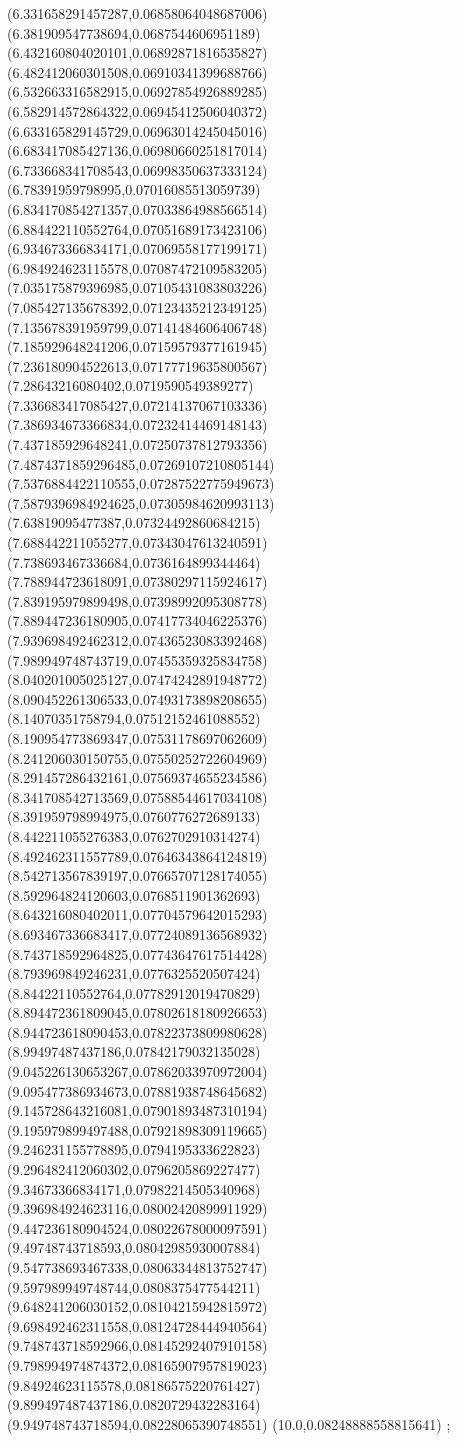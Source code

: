 {(6.331658291457287,0.06858064048687006)
(6.381909547738694,0.0687544606951189)
(6.432160804020101,0.06892871816535827)
(6.482412060301508,0.06910341399688766)
(6.532663316582915,0.06927854926889285)
(6.582914572864322,0.06945412506040372)
(6.633165829145729,0.06963014245045016)
(6.683417085427136,0.06980660251817014)
(6.733668341708543,0.06998350637333124)
(6.78391959798995,0.07016085513059739)
(6.834170854271357,0.07033864988566514)
(6.884422110552764,0.07051689173423106)
(6.934673366834171,0.07069558177199171)
(6.984924623115578,0.07087472109583205)
(7.035175879396985,0.07105431083803226)
(7.085427135678392,0.07123435212349125)
(7.135678391959799,0.07141484606406748)
(7.185929648241206,0.07159579377161945)
(7.236180904522613,0.07177719635800567)
(7.28643216080402,0.0719590549389277)
(7.336683417085427,0.07214137067103336)
(7.386934673366834,0.07232414469148143)
(7.437185929648241,0.07250737812793356)
(7.4874371859296485,0.07269107210805144)
(7.5376884422110555,0.07287522775949673)
(7.5879396984924625,0.07305984620993113)
(7.63819095477387,0.07324492860684215)
(7.688442211055277,0.07343047613240591)
(7.738693467336684,0.0736164899344464)
(7.788944723618091,0.07380297115924617)
(7.839195979899498,0.07398992095308778)
(7.889447236180905,0.07417734046225376)
(7.939698492462312,0.07436523083392468)
(7.989949748743719,0.07455359325834758)
(8.040201005025127,0.07474242891948772)
(8.090452261306533,0.07493173898208655)
(8.14070351758794,0.07512152461088552)
(8.190954773869347,0.07531178697062609)
(8.241206030150755,0.07550252722604969)
(8.291457286432161,0.07569374655234586)
(8.341708542713569,0.07588544617034108)
(8.391959798994975,0.0760776272689133)
(8.442211055276383,0.0762702910314274)
(8.492462311557789,0.07646343864124819)
(8.542713567839197,0.07665707128174055)
(8.592964824120603,0.0768511901362693)
(8.643216080402011,0.07704579642015293)
(8.693467336683417,0.07724089136568932)
(8.743718592964825,0.07743647617514428)
(8.793969849246231,0.0776325520507424)
(8.84422110552764,0.07782912019470829)
(8.894472361809045,0.07802618180926653)
(8.944723618090453,0.07822373809980628)
(8.99497487437186,0.07842179032135028)
(9.045226130653267,0.07862033970972004)
(9.095477386934673,0.07881938748645682)
(9.145728643216081,0.07901893487310194)
(9.195979899497488,0.07921898309119665)
(9.246231155778895,0.0794195333622823)
(9.296482412060302,0.0796205869227477)
(9.34673366834171,0.07982214505340968)
(9.396984924623116,0.08002420899911929)
(9.447236180904524,0.08022678000097591)
(9.49748743718593,0.08042985930007884)
(9.547738693467338,0.08063344813752747)
(9.597989949748744,0.0808375477544211)
(9.648241206030152,0.08104215942815972)
(9.698492462311558,0.08124728444940564)
(9.748743718592966,0.08145292407910158)
(9.798994974874372,0.08165907957819023)
(9.84924623115578,0.08186575220761427)
(9.899497487437186,0.0820729432283164)
(9.949748743718594,0.08228065390748551)
(10.0,0.08248888558815641)
};
